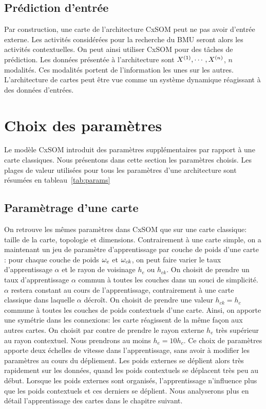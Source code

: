 \subsection{Prédiction d'entrée}
Par construction, une carte de l'architecture CxSOM peut ne pas avoir d'entrée externe. Les activités considérées pour la recherche du BMU seront alors les activités contextuelles. On peut ainsi utiliser CxSOM pour des tâches de prédiction. Les données présentée à l'architecture sont $X^{({1})}, \cdots, X^{({n})}$, $n$ modalités. Ces modalités portent de l'information les unes sur les autres. 
L'architecture de cartes peut être vue comme un système dynamique réagissant à des données d'entrées.


\section{Choix des paramètres}\label{sec:params}

Le modèle CxSOM introduit des paramètres supplémentaires par rapport à une carte classiques. Nous présentons dans cette section les paramètres choisis. Les plages de valeur utilisées pour tous les paramètres d'une architecture sont résumées en tableau~\ref{tab:params}
\subsection{Paramètrage d'une carte}
On retrouve les mêmes paramètres dans CxSOM que sur une carte classique: taille de la carte, topologie et dimensions. 
Contrairement à une carte simple, on a maintenant un jeu de paramètre d'apprentissage par couche de poids d'une carte : pour chaque couche de poids $\omega_e$ et $\omega_{ck}$, on peut faire varier le taux d'apprentissage $\alpha$ et le rayon de voisinage $h_e$ ou $h_{ck}$.
On choisit de prendre un taux d'apprentissage $\alpha$ commun à toutes les couches dans un souci de simplicité. $\alpha$ restera constant au cours de l'apprentissage, contrairement à une carte classique dans laquelle $\alpha$ décroît.
On choisit de prendre une valeur $h_{ck} = h_c$ commune à toutes les couches de poids contextuels d'une carte. Ainsi, on apporte une symétrie dans les connexions: les carte réagissent de la même façon aux autres cartes.
On choisit par contre de prendre le rayon externe $h_e$ très supérieur au rayon contextuel. Nous prendrons au moins $h_e = 10 h_c$. Ce choix de paramètres apporte deux échelles de vitesse dans l'apprentissage, sans avoir à modifier les paramètres au cours du dépliement. Les poids externes se déplient alors très rapidement sur les données, quand les poids contextuels se déplacent très peu au début. Lorsque les poids externes sont organisés, l'apprentissage n'influence plus que les poids contextuels et ces derniers se déplient. Nous analyserons plus en détail l'apprentissage des cartes dans le chapitre suivant.


